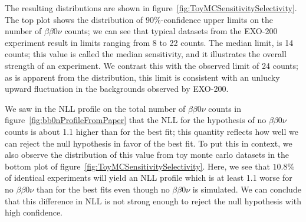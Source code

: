 \renewcommand{\baselinestretch}{2}
\small\normalsize

The resulting distributions are shown in figure~\ref{fig:ToyMCSensitivitySelectivity}.  The top plot shows the distribution of $90\%$-confidence upper limits on the number of $\beta\beta 0\nu$ counts; we can see that typical datasets from the EXO-200 experiment result in limits ranging from 8 to 22 counts.  The median limit, is 14 counts; this value is called the median sensitivity, and it illustrates the overall strength of an experiment.  We contrast this with the observed limit of 24 counts; as is apparent from the distribution, this limit is consistent with an unlucky upward fluctuation in the backgrounds observed by EXO-200.

We saw in the NLL profile on the total number of $\beta\beta 0\nu$ counts in figure~\ref{fig:bb0nProfileFromPaper} that the NLL for the hypothesis of no $\beta\beta 0\nu$ counts is about 1.1 higher than for the best fit; this quantity reflects how well we can reject the null hypothesis in favor of the best fit.  To put this in context, we also observe the distribution of this value from toy monte carlo datasets in the bottom plot of figure~\ref{fig:ToyMCSensitivitySelectivity}.  Here, we see that $10.8\%$ of identical experiments will yield an NLL profile which is at least 1.1 worse for no $\beta\beta 0\nu$ than for the best fits even though no $\beta\beta 0\nu$ is simulated.  We can conclude that this difference in NLL is not strong enough to reject the null hypothesis with high confidence.

